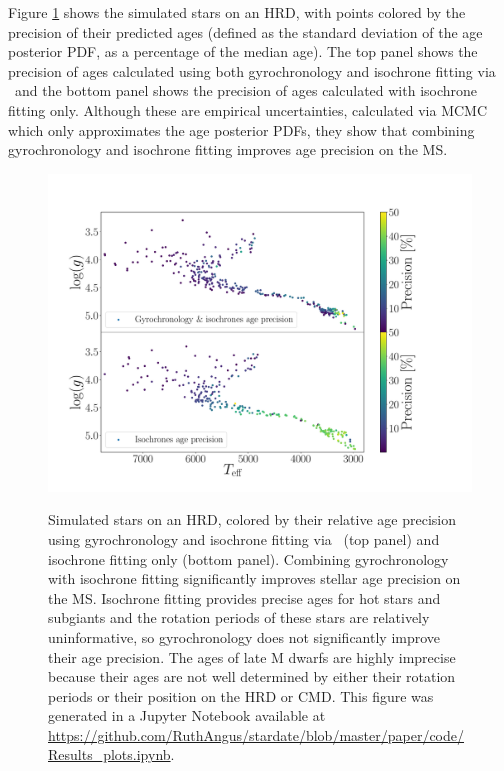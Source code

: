 Figure \ref{fig:precision} shows the simulated stars on an HRD, with
points colored by the precision of their predicted ages
(defined as the standard deviation of the age
posterior PDF, as a percentage of the median age).
The top panel shows the precision of ages calculated using both gyrochronology
and isochrone fitting via \sd\ and the bottom panel shows the precision of
ages calculated with isochrone fitting only.
Although these are empirical uncertainties, calculated via MCMC which only
approximates the age posterior PDFs, they show that combining gyrochronology
and isochrone fitting improves age precision on the MS.
\begin{figure}
  \caption{
Simulated stars on an HRD, colored by their relative age precision
    using gyrochronology and isochrone fitting via \sd\ (top panel) and
    isochrone fitting only (bottom panel).
Combining gyrochronology with isochrone fitting significantly improves stellar
    age precision on the MS.
Isochrone fitting provides precise ages for hot stars and subgiants and the
    rotation periods of these stars are relatively uninformative, so
    gyrochronology does not significantly improve their age precision.
The ages of late M dwarfs are highly imprecise because their ages are not well
    determined by either their rotation periods or their position on the HRD
    or CMD.
    This figure was generated in a Jupyter Notebook available at
    \url{https://github.com/RuthAngus/stardate/blob/master/paper/code/Results_plots.ipynb}.
}
  \centering
    \includegraphics[width=1\textwidth]{precision_plot}
\label{fig:precision}
\end{figure}

